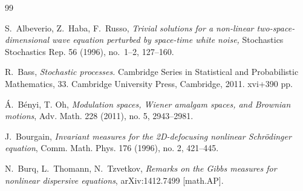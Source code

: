 \documentclass[letterpaper, 11pt,  reqno]{amsart}
\newcommand{\1}{\hspace{0.5mm}\text{I}\hspace{0.5mm}}
\numberwithin{equation}{section}
\numberwithin{theorem}{section}
\begin{document}
\begin{thebibliography}{99}




%


S.~Albeverio, Z.~Haba, F.~Russo, 
{\it Trivial solutions for a non-linear two-space-dimensional wave equation perturbed by space-time white noise,} Stochastics Stochastics Rep.  56 (1996), no.~1--2, 127--160. 


R.~Bass, 
{\it Stochastic processes.}
Cambridge Series in Statistical and Probabilistic Mathematics, 33. Cambridge University Press, Cambridge, 2011. xvi+390 pp. 


\'A.~B\'enyi, T. Oh, 
{\it Modulation spaces, Wiener amalgam spaces, and Brownian motions}, Adv. Math. 228 (2011), no. 5, 2943--2981.






J.~Bourgain, 
{\it Invariant measures for the 2D-defocusing nonlinear Schr\"odinger equation}, 
Comm. Math. Phys. 176 (1996), no. 2, 421--445. 






N.~Burq, L.~Thomann, N.~Tzvetkov, 
{\it Remarks on the Gibbs measures for nonlinear dispersive equations}, 
arXiv:1412.7499 [math.AP].



\end{thebibliography}
\end{document}
